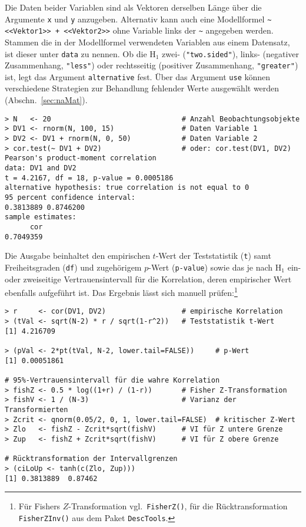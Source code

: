 Die Daten beider Variablen sind als Vektoren derselben Länge über die Argumente \lstinline!x! und \lstinline!y! anzugeben. Alternativ kann auch eine Modellformel \lstinline!~ <<Vektor1>> + <<Vektor2>>! ohne Variable links der \lstinline!~! angegeben werden. Stammen die in der Modellformel verwendeten Variablen aus einem Datensatz, ist dieser unter \lstinline!data! zu nennen. Ob die $\text{H}_{1}$ zwei- (\lstinline!"two.sided"!), links- (negativer Zusammenhang, \lstinline!"less"!) oder rechtsseitig (positiver Zusammenhang, \lstinline!"greater"!) ist, legt das Argument \lstinline!alternative! fest. Über das Argument \lstinline!use! können verschiedene Strategien zur Behandlung fehlender Werte ausgewählt werden (Abschn.\ \ref{sec:naMat}).
\begin{lstlisting}
> N   <- 20                               # Anzahl Beobachtungsobjekte
> DV1 <- rnorm(N, 100, 15)                # Daten Variable 1
> DV2 <- DV1 + rnorm(N, 0, 50)            # Daten Variable 2
> cor.test(~ DV1 + DV2)                   # oder: cor.test(DV1, DV2)
Pearson's product-moment correlation
data: DV1 and DV2
t = 4.2167, df = 18, p-value = 0.0005186
alternative hypothesis: true correlation is not equal to 0
95 percent confidence interval:
0.3813889 0.8746200
sample estimates:
      cor
0.7049359
\end{lstlisting}

Die Ausgabe beinhaltet den empirischen $t$-Wert der Teststatistik (\lstinline!t!) samt Freiheitsgraden (\lstinline!df!) und zugehörigem $p$-Wert (\lstinline!p-value!) sowie das je nach $\text{H}_{1}$ ein- oder zweiseitige Vertrauensintervall für die Korrelation, deren empirischer Wert ebenfalls aufgeführt ist. Das Ergebnis lässt sich manuell prüfen:\footnote{Für Fishers $Z$-Transformation vgl.\ \lstinline!FisherZ()!, für die Rücktransformation \lstinline!FisherZInv()! aus dem Paket \lstinline!DescTools!.}
\begin{lstlisting}
> r     <- cor(DV1, DV2)                  # empirische Korrelation
> (tVal <- sqrt(N-2) * r / sqrt(1-r^2))   # Teststatistik t-Wert
[1] 4.216709

> (pVal <- 2*pt(tVal, N-2, lower.tail=FALSE))     # p-Wert
[1] 0.00051861

# 95%-Vertrauensintervall für die wahre Korrelation
> fishZ <- 0.5 * log((1+r) / (1-r))       # Fisher Z-Transformation
> fishV <- 1 / (N-3)                      # Varianz der Transformierten
> Zcrit <- qnorm(0.05/2, 0, 1, lower.tail=FALSE)  # kritischer Z-Wert
> Zlo   <- fishZ - Zcrit*sqrt(fishV)      # VI für Z untere Grenze
> Zup   <- fishZ + Zcrit*sqrt(fishV)      # VI für Z obere Grenze

# Rücktransformation der Intervallgrenzen
> (ciLoUp <- tanh(c(Zlo, Zup)))
[1] 0.3813889  0.87462
\end{lstlisting}

